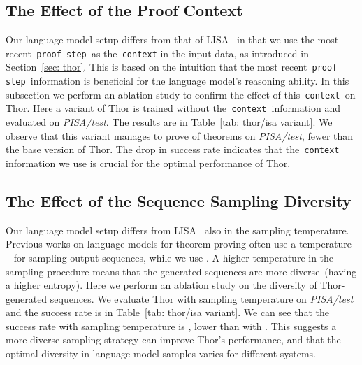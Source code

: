 \documentclass{article}
\begin{document}
\subsection{The Effect of the Proof Context}
Our language model setup differs from that of LISA~\citep{jiang2021lisa} in that we use the most recent\texttt{ proof step }as the\texttt{ context} in the input data, as introduced in Section~\ref{sec: thor}. This is based on the intuition that the most recent\texttt{ proof step }information is beneficial for the language model's reasoning ability.
In this subsection we perform an ablation study to confirm the effect of this\texttt{ context }on Thor.
Here a variant of Thor is trained without the\texttt{ context }information and evaluated on \emph{PISA/test}. The results are in Table~\ref{tab: thor/isa variant}.
We observe that this variant manages to prove  of theorems on \emph{PISA/test},  fewer than the base version of Thor.
The drop in success rate indicates that the\texttt{ context }information we use is crucial for the optimal performance of Thor.

\subsection{The Effect of the Sequence Sampling Diversity}
Our language model setup differs from LISA~\citep{jiang2021lisa} also in the sampling temperature.
Previous works on language models for theorem proving often use a temperature ~\citep{polu2020generative, jiang2021lisa} for sampling output sequences, while we use .
A higher temperature in the sampling procedure means that the generated sequences are more diverse~(having a higher entropy).
Here we perform an ablation study on the diversity of Thor-generated sequences.
We evaluate Thor with sampling temperature  on \emph{PISA/test} and the success rate is in Table~\ref{tab: thor/isa variant}.
We can see that the success rate with sampling temperature  is ,  lower than with .
This suggests a more diverse sampling strategy can improve Thor's performance, and that the optimal diversity in language model samples varies for different systems.
\end{document}
